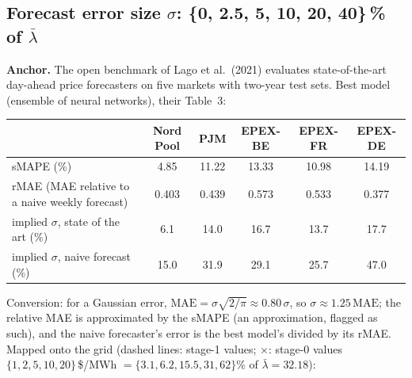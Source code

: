 \documentclass[10pt,a4paper]{article}
\begin{document}
\subsection{Forecast error size $\sigma$: \{0, 2.5, 5, 10, 20, 40\}\,\% of $\bar\lambda$}
\textbf{Anchor.} The open benchmark of Lago et al.\ (2021) evaluates state-of-the-art day-ahead price
forecasters on five markets with two-year test sets. Best model (ensemble of neural networks), their Table~3:
\begin{center}\small
\begin{tabular}{@{}lccccc@{}}
\toprule
 & Nord Pool & PJM & EPEX-BE & EPEX-FR & EPEX-DE \\
\midrule
sMAPE (\%) & 4.85 & 11.22 & 13.33 & 10.98 & 14.19 \\
rMAE (MAE relative to a naive weekly forecast) & 0.403 & 0.439 & 0.573 & 0.533 & 0.377 \\
implied $\sigma$, state of the art (\%) & 6.1 & 14.0 & 16.7 & 13.7 & 17.7 \\
implied $\sigma$, naive forecast (\%) & 15.0 & 31.9 & 29.1 & 25.7 & 47.0 \\
\bottomrule
\end{tabular}
\end{center}
Conversion: for a Gaussian error, $\text{MAE}=\sigma\sqrt{2/\pi}\approx0.80\,\sigma$, so
$\sigma\approx1.25\,\text{MAE}$; the relative MAE is approximated by the sMAPE (an approximation, flagged as
such), and the naive forecaster's error is the best model's divided by its rMAE. Mapped onto the grid
(dashed lines: stage-1 values; $\times$: stage-0 values $\{1,2,5,10,20\}$\,\$/MWh $=\{3.1,6.2,15.5,31,62\}\%$
of $\bar\lambda=32.18$):
\begin{center}
\end{center}
\end{document}

